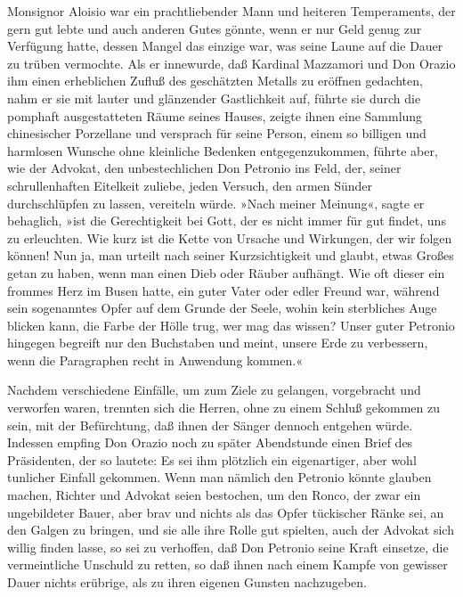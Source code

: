 Monsignor Aloisio war ein prachtliebender Mann und heiteren
Temperaments, der gern gut lebte und auch anderen Gutes gönnte,
wenn er nur Geld genug zur Verfügung hatte, dessen Mangel das
einzige war, was seine Laune auf die Dauer zu trüben vermochte. Als
er innewurde, daß Kardinal Mazzamori und Don Orazio ihm einen
erheblichen Zufluß des geschätzten Metalls zu eröffnen gedachten,
nahm er sie mit lauter und glänzender Gastlichkeit auf, führte sie
durch die pomphaft ausgestatteten Räume seines Hauses, zeigte ihnen
eine Sammlung chinesischer Porzellane und versprach für seine
Person, einem so billigen und harmlosen Wunsche ohne kleinliche
Bedenken entgegenzukommen, führte aber, wie der Advokat, den
unbestechlichen Don Petronio ins Feld, der, seiner schrullenhaften
Eitelkeit zuliebe, jeden Versuch, den armen Sünder \pagenum{[74]}
durchschlüpfen zu lassen, vereiteln würde. »Nach meiner Meinung«,
sagte er behaglich, »ist die Gerechtigkeit bei Gott, der es nicht
immer für gut findet, uns zu erleuchten. Wie kurz ist die Kette von
Ursache und Wirkungen, der wir folgen können! Nun ja, man urteilt
nach seiner Kurzsichtigkeit und glaubt, etwas Großes getan zu
haben, wenn man einen Dieb oder Räuber aufhängt. Wie oft dieser ein
frommes Herz im Busen hatte, ein guter Vater oder edler Freund war,
während sein sogenanntes Opfer auf dem Grunde der Seele, wohin kein
sterbliches Auge blicken kann, die Farbe der Hölle trug, wer mag
das wissen? Unser guter Petronio hingegen begreift nur den
Buchstaben und meint, unsere Erde zu verbessern, wenn die
Paragraphen recht in Anwendung kommen.«

Nachdem verschiedene Einfälle, um zum Ziele zu gelangen,
vorgebracht und verworfen waren, trennten sich die Herren, ohne zu
einem Schluß gekommen zu sein, mit der Befürchtung, daß ihnen der
Sänger dennoch entgehen würde. Indessen empfing Don Orazio noch zu
später Abendstunde einen Brief des Präsidenten, der so lautete: Es
sei ihm plötzlich ein eigenartiger, aber wohl tunlicher Einfall
gekommen. Wenn man nämlich den Petronio könnte glauben machen,
Richter und Advokat seien bestochen, um den Ronco, der zwar ein
ungebildeter Bauer, aber brav und nichts als das Opfer tückischer
Ränke sei, an den Galgen zu bringen, und sie alle ihre Rolle gut
spielten, auch der Advokat sich willig finden lasse, so sei zu
verhoffen, daß Don Petronio seine Kraft einsetze, die vermeintliche
Unschuld zu retten, so daß ihnen nach einem Kampfe von gewisser
Dauer nichts erübrige, als zu ihren eigenen Gunsten nachzugeben.

